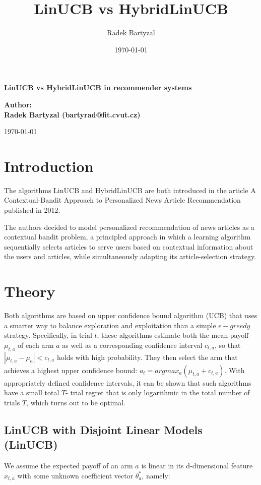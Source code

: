 \documentclass[12pt, titlepage]{article}
\title{LinUCB vs HybridLinUCB}
\date{\today}
\author{Radek Bartyzal}
\begin{document}
\begin{titlepage}
    \centering
    \vfill
    {\bfseries\Huge
        LinUCB vs HybridLinUCB in recommender systems
    }    
    \vfill
        
    
        
    {\bfseries\Large 
    Author:\\
    Radek Bartyzal (bartyrad@fit.cvut.cz)\\
    }    
    \vskip1cm
 
    \vskip1cm
    \today

    
    \vfill
\end{titlepage}

\pagebreak

\section{Introduction}\label{sec:intro}
The algorithms LinUCB and HybridLinUCB are both introduced in the article A Contextual-Bandit Approach to
Personalized News Article Recommendation published in 2012.

The authors decided to model personalized recommendation of news
articles as a contextual bandit problem, a principled approach in
which a learning algorithm sequentially selects articles to serve
users based on contextual information about the users and articles,
while simultaneously adapting its article-selection strategy.

\section{Theory}\label{sec:theory}
Both algorithms are based on upper confidence bound algorithm (UCB) that uses a smarter way to balance
exploration and exploitation than a simple $\epsilon-greedy$ strategy. 
Specifically, in trial $t$, these algorithms
estimate both the mean payoff $\mu_{t,a}$ of each arm $a$ as well
as a corresponding confidence interval $c_{t,a}$, so that $|\mu_{t,a} - \mu_a| <
c_{t,a}$ holds with high probability. They then select the arm that
achieves a highest upper confidence bound: $a_t =
arg max_a (\mu_{t,a} + c_{t,a})$. With appropriately defined confidence intervals,
it can be shown that such algorithms have a small total $T$-
trial regret that is only logarithmic in the total number of trials $T$,
which turns out to be optimal. 

\subsection{LinUCB with Disjoint Linear Models (LinUCB)}
We assume the expected payoff of an arm $a$ is linear in its d-dimensional feature $x_{t,a}$ with some unknown coefficient vector $\theta^*_a$, namely:
\end{document}
